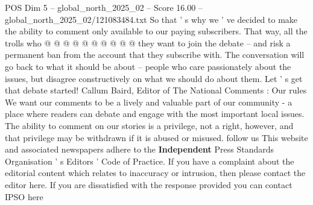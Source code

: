 \begin{textsample}{POS Dim 5 – global\_north\_2025\_02 – Score 16.00 – global\_north\_2025\_02/121083484.txt}
So that ' s why we ' ve decided to make the ability to comment only available to our paying subscribers.
That way, all the trolls who @ @ @ @ @ @ @ @ @ @ they want to join the debate -- and risk a permanent ban from the account that they subscribe with.
The conversation will go back to what it should be about -- people who care passionately about the issues, but disagree constructively on what we should do about them.
Let ' s get that debate started!
Callum Baird, Editor of The National Comments : Our rules We want our comments to be a lively and valuable part of our community - a place where readers can debate and engage with the most important local issues.
The ability to comment on our stories is a privilege, not a right, however, and that privilege may be withdrawn if it is abused or misused. follow us This website and associated newspapers adhere to the \textbf{Independent} Press Standards Organisation ' s Editors ' Code of Practice.
If you have a complaint about the editorial content which relates to inaccuracy or intrusion, then please contact the editor here.
If you are dissatisfied with the response provided you can contact IPSO here

\end{textsample}
